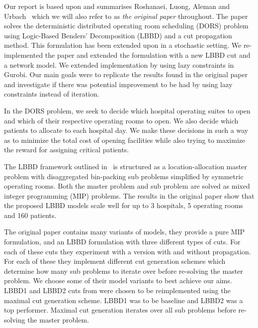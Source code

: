Our report is based upon and summarises Roshanaei, Luong, Aleman and Urbach~\cite{roshanaei2017propagating} which we will also refer to as \textit{the original paper} throughout. The paper solves the deterministic distributed  operating room scheduling (DORS) problem using Logic-Based Benders' Decomposition (LBBD) and a cut propagation method. This formulation has been extended upon in a stochastic setting\cite{guo}. We re-implemented the paper and extended the formulation with a new LBBD cut and a network model. We extended implementation by using lazy constraints in Gurobi. Our main goals were to replicate the results found in the original paper and investigate if there was potential improvement to be had by using lazy constraints instead of iteration.

In the DORS problem, we seek to decide which hospital operating suites to open and which of their respective operating rooms to open. We also decide which patients to allocate to each hospital day. We make these decisions in such a way as to minimize the total cost of opening facilities while also trying to maximize the reward for assigning critical patients\cite{roshanaei2017propagating}.

The LBBD framework outlined in~\cite{roshanaei2017propagating} is structured as a location-allocation master problem with disaggregated bin-packing sub problems simplified by symmetric operating rooms. Both the master problem and sub problem are solved as mixed integer programming (MIP) problems. The results in the original paper show that the proposed LBBD models scale well for up to 3 hospitals, 5 operating rooms and 160 patients.

The original paper contains many variants of models, they provide a pure MIP formulation, and an LBBD formulation with three different types of cuts. For each of these cuts they experiment with a version with and without propagation. For each of these they implement different cut generation schemes which determine how many sub problems to iterate over before re-solving the master problem. We choose some of their model variants to best achieve our aims. LBBD1 and LBBD2 cuts from \cite{roshanaei2017propagating} were chosen to be reimplemented using the maximal cut generation scheme. LBBD1 was to be baseline and LBBD2 was a top performer. Maximal cut generation iterates over all sub problems before re-solving the master problem.

